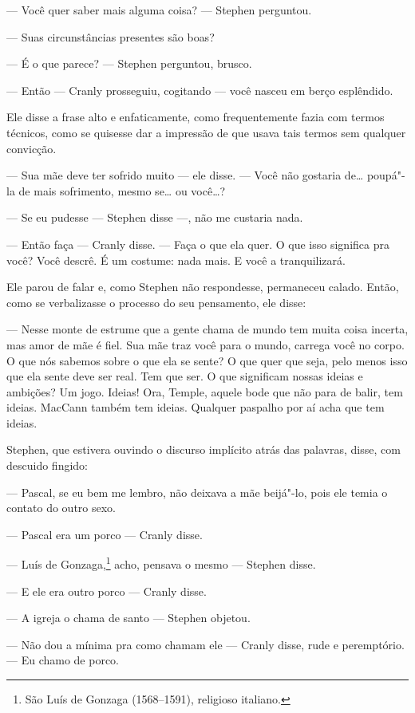  --- Você quer saber mais alguma coisa? --- Stephen perguntou.

 --- Suas circunstâncias presentes são boas?

 --- É o que parece? --- Stephen perguntou, brusco.

 --- Então --- Cranly prosseguiu, cogitando --- você nasceu em berço esplêndido.

Ele disse a frase alto e enfaticamente, como frequentemente fazia com termos
técnicos, como se quisesse dar a impressão de que usava tais termos sem
qualquer convicção.

 --- Sua mãe deve ter sofrido muito --- ele disse. --- Você não gostaria de\ldots{}
poupá"-la de mais sofrimento, mesmo se\ldots{} ou você\ldots{}?

 --- Se eu pudesse --- Stephen disse ---, não me custaria nada.

 --- Então faça --- Cranly disse. --- Faça o que ela quer. O que isso significa
pra você? Você descrê. É um costume: nada mais. E você a tranquilizará.

Ele parou de falar e, como Stephen não respondesse, permaneceu calado.
Então, como se verbalizasse o processo do seu pensamento, ele disse:

 --- Nesse monte de estrume
que a gente chama de mundo tem muita coisa incerta, mas amor de mãe é
fiel. Sua mãe traz você para o mundo, carrega você no corpo. O que nós
sabemos sobre o que ela se sente? O que quer que seja, pelo menos isso
que ela sente deve ser real. Tem que ser. O que significam nossas
ideias e ambições? Um jogo. Ideias! Ora, Temple, aquele bode que não
para de balir, tem ideias. MacCann também tem ideias. Qualquer paspalho
por aí acha que tem ideias.

Stephen, que estivera ouvindo o discurso implícito atrás das palavras,
disse, com descuido fingido:

 --- Pascal, se eu bem me lembro, não deixava a mãe beijá"-lo,
pois ele temia o contato do outro sexo.

 --- Pascal era um porco --- Cranly disse.

 --- Luís de Gonzaga,\footnote{ São Luís de Gonzaga (1568--1591), religioso italiano.}  acho, pensava o mesmo --- Stephen disse.

 --- E ele era outro porco --- Cranly disse.

 --- A igreja o chama de santo --- Stephen objetou.

 --- Não dou a mínima pra como chamam ele --- Cranly disse, rude e
peremptório. --- Eu chamo de porco.

